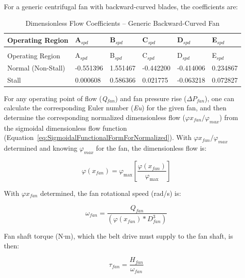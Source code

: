 For a generic centrifugal fan with backward-curved blades, the coefficients are:

\begin{longtable}[c]{@{}llllll@{}}
\caption{Dimensionless Flow Coefficients – Generic Backward-Curved Fan \label{table:dimensionless-flow-coefficients-generic}} \tabularnewline
\toprule 
Operating Region & A\(_{spd}\) & B\(_{spd}\) & C\(_{spd}\) & D\(_{spd}\) & E\(_{spd}\) \tabularnewline
\midrule
\endfirsthead

\caption[]{Dimensionless Flow Coefficients – Generic Backward-Curved Fan} \tabularnewline
\toprule 
Operating Region & A\(_{spd}\) & B\(_{spd}\) & C\(_{spd}\) & D\(_{spd}\) & E\(_{spd}\) \tabularnewline
\midrule
\endhead

Normal (Non-Stall) & -0.551396 & 1.551467 & -0.442200 & -0.414006 & 0.234867 \tabularnewline
Stall & 0.000608 & 0.586366 & 0.021775 & -0.063218 & 0.072827 \tabularnewline
\bottomrule
\end{longtable}

For any operating point of flow (\emph{Q\(_{fan}\)}) and fan pressure rise (\(\Delta {P_{fan}}\)), one can calculate the corresponding Euler number (\emph{Eu}) for the given fan, and then determine the corresponding normalized dimensionless flow (\(\varphi {x_{fan}} / \varphi_{max}\)) from the sigmoidal dimensionless flow function (Equation~\ref{eq:SigmoidalFunctionalFormForNormalized}). With \(\varphi {x_{fan}} / \varphi_{max}\) determined and knowing \(\varphi_{max}\) for the fan, the dimensionless flow is:

\begin{equation}
\varphi \left( {{x_{fan}}} \right) = {\varphi_{\max }}\left[ {\frac{{\varphi \left( {{x_{fan}}} \right)}}{{{\varphi_{\max }}}}} \right]
\end{equation}

With \(\varphi {x_{fan}}\) determined, the fan rotational speed (rad/s) is:

\begin{equation}
{\omega_{fan}} = \frac{{{Q_{fan}}}}{{\left( {\varphi ({x_{fan}}) * D_{fan}^3} \right)}}
\end{equation}

Fan shaft torque (N∙m), which the belt drive must supply to the fan shaft, is then:

\begin{equation}
{\tau_{fan}} = \frac{{{H_{fan}}}}{{{\omega_{fan}}}} 
\end{equation}

